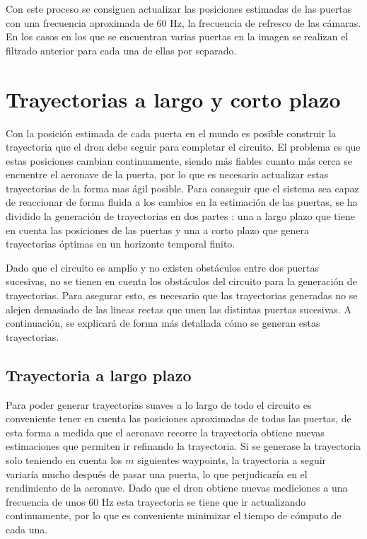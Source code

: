 Con este proceso se consiguen actualizar las posiciones estimadas de las puertas con una frecuencia aproximada de 60 Hz, la frecuencia de refresco de las cámaras. En los casos en los que se encuentran varias puertas en la imagen se realizan el filtrado anterior para cada una de ellas por separado.

\section{Trayectorias a largo y corto plazo}

Con la posición estimada de cada puerta en el mundo es posible construir la trayectoria que el dron debe seguir para completar el circuito. El problema es que estas posiciones cambian continuamente, siendo más fiables cuanto más cerca se encuentre el aeronave de la puerta, por lo que es necesario actualizar estas trayectorias de la forma mas ágil posible. Para conseguir que el sistema sea capaz de reaccionar de forma fluida a los cambios en la estimación de las puertas, se ha dividido la generación de trayectorias en dos partes : una a largo plazo que tiene en cuenta las posiciones de las puertas y una a corto plazo que genera trayectorias óptimas en un horizonte temporal finito.

Dado que el circuito es amplio y no existen obstáculos entre dos puertas sucesivas, no se tienen en cuenta los obstáculos del circuito para la generación de trayectorias. Para asegurar esto, es necesario que las trayectorias generadas no se alejen demasiado de las lineas rectas que unen las distintas puertas sucesivas. A continuación, se explicará de forma más detallada cómo se generan estas trayectorias.
\subsection{Trayectoria a largo plazo}

Para poder generar trayectorias suaves a lo largo de todo el circuito es conveniente tener en cuenta las posiciones aproximadas de todas las puertas,  de esta forma a medida que el aeronave recorre la trayectoria obtiene nuevas estimaciones que permiten ir refinando la trayectoria. Si se generase la trayectoria solo teniendo en cuenta los $m$ siguientes waypoints, la trayectoria a seguir variaría mucho después de pasar una puerta, lo que perjudicaría en el rendimiento de la aeronave. Dado que el dron obtiene nuevas mediciones a una frecuencia de unos 60 Hz esta trayectoria se tiene que ir actualizando continuamente, por lo que es conveniente minimizar el tiempo de cómputo de cada una. 

